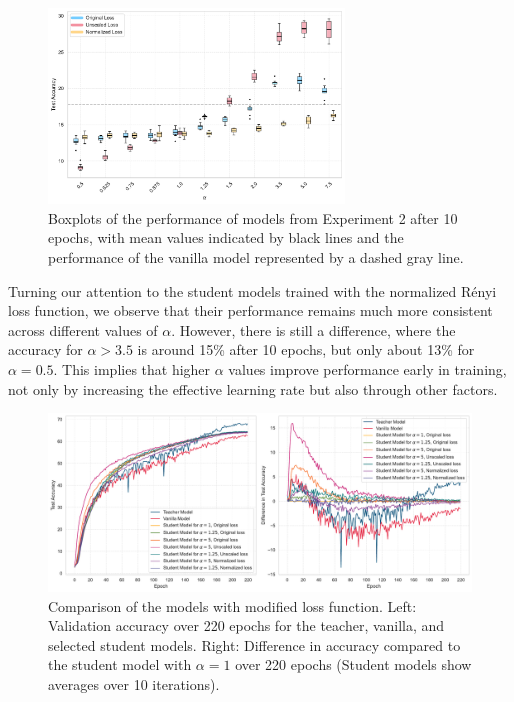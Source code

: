 \begin{figure}[h!]
	\centering
	\includegraphics[width=0.7\textwidth]{../img/exp2_box_grouped_10.pdf}
	\caption{Boxplots of the performance of models from Experiment 2 after 10 epochs, with mean values indicated by black lines and the performance of the vanilla model represented by a dashed gray line.}
	\label{fig:exp2_box_grouped_10}
\end{figure}

Turning our attention to the student models trained with the normalized Rényi loss function, we observe that their performance remains much more consistent across different values of $\alpha$. However, there is still a difference, where the accuracy for $\alpha>3.5$ is around 15\% after 10 epochs, but only about 13\% for $\alpha=0.5$. This implies that higher $\alpha$ values improve performance early in training, not only by increasing the effective learning rate but also through other factors.

\begin{figure}[h!]
	\centering
	\includegraphics[width=1\textwidth]{../img/exp2_line_and_diff_plot.pdf}
	\caption{Comparison of the models with modified loss function. Left: Validation accuracy over 220 epochs for the teacher, vanilla, and selected student models. Right: Difference in accuracy compared to the student model with $\alpha=1$ over 220 epochs (Student models show averages over 10 iterations).}
	\label{fig:exp2_line_and_diff_plot}
\end{figure}

